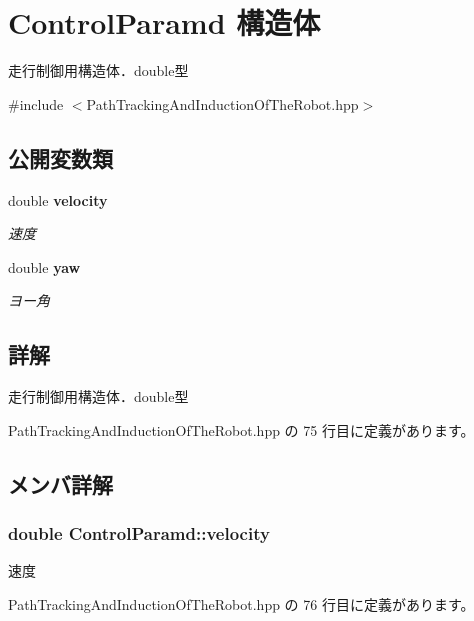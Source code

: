 \section{Control\-Paramd 構造体}
\label{struct_control_paramd}


走行制御用構造体．double型  




{\ttfamily \#include $<$Path\-Tracking\-And\-Induction\-Of\-The\-Robot.\-hpp$>$}

\subsection*{公開変数類}
\begin{DoxyCompactItemize}
\item 
double {\bf velocity}
\begin{DoxyCompactList}\small\item\em 速度 \end{DoxyCompactList}\item 
double {\bf yaw}
\begin{DoxyCompactList}\small\item\em ヨー角 \end{DoxyCompactList}\end{DoxyCompactItemize}


\subsection{詳解}
走行制御用構造体．double型 

 Path\-Tracking\-And\-Induction\-Of\-The\-Robot.\-hpp の 75 行目に定義があります。



\subsection{メンバ詳解}
\subsubsection[{velocity}]{\setlength{\rightskip}{0pt plus 5cm}double Control\-Paramd\-::velocity}\label{struct_control_paramd_a918e830ff34f22e64055f59d62a97f10}


速度 



 Path\-Tracking\-And\-Induction\-Of\-The\-Robot.\-hpp の 76 行目に定義があります。



